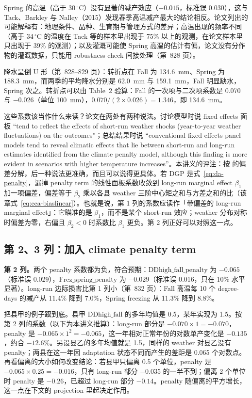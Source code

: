 Spring 的高温（高于 30\,$^\circ$C）没有显著的减产效应（$-0.015$，标准误 0.030），这与 Tack、Barkley 与 Nalley（2015）发现春季高温减产最大的结论相反。论文列出的可能解释有：地理条件、品种、生育期与管理方式的差异；高温出现的频率不同（高于 34\,$^\circ$C 的温度在 Tack 等的样本里出现于 75\% 以上的观测，在论文样本里只出现于 39\% 的观测）；以及灌溉可能使 Spring 高温的估计有偏，论文没有分作物的灌溉数据，只能用 robustness check 间接处理（第~828 页）。

降水呈倒 U 形（第~828--829 页）：转折点在 Fall 为 134.6~mm、Spring 为 188.3~mm，而两季的平均降水分别是 62.0~mm 与 159.1~mm，Fall 明显缺水，Spring 次之。转折点可以由 Table~2 验算：Fall 的一次项与二次项系数是 0.070 与 $-0.026$（单位 100~mm），$0.070/(2\times0.026)=1.346$，即 134.6~mm。

这些系数该当作什么来读？论文在两处有两种说法。讨论模型时说 fixed effects 面板 ``tend to reflect the effects of short-run weather shocks (year-to-year weather fluctuations) on the outcomes''\citep[第~823 页]{da2024climate}；总结结果时说 ``conventional fixed effects panel models tend to reveal climatic effects that lie between short-run and long-run estimates identified from the climate penalty model, although this finding is more evident in scenarios with higher temperature increases''\citep[第~818 页]{da2024climate}。本讲义的评注：按  的偏差分解，后一种说法更准确，而且可以说得更具体。若 DGP 是式~\ref{eq:da-penalty}，漏掉 penalty term 的线性面板系数收敛到 long-run marginal effect $\beta_1$ 加一项偏差，偏差等于 $\beta_2$ 乘以各县 weather 三阶中心矩之和与方差之和的比（该章式~\ref{eq:cca-biaslinear}）。也就是说，第 1 列的系数应读作「带偏差的 long-run marginal effect」：它瞄准的是 $\beta_1$，而不是某个 short-run 效应；weather 分布对称时偏差为零，右偏且 $\beta_2<0$ 时系数比 $\beta_1$ 更负。第 2 列正好可以对照这一点。

\subsection{第 2、3 列：加入 climate penalty term}

\textbf{第 2 列。}两个 penalty 系数都为负，符合预期：$\mathrm{DDhigh\_fall\_penalty}$ 为 $-0.065$（标准误 0.029），$\mathrm{Frez\_spring\_penalty}$ 为 $-0.029$（标准误 0.016，只在 10\% 水平显著）。long-run 边际损害比第 1 列小（第~832 页）：Fall 高温每 10 个 degree-days 的减产从 11.4\% 降到 7.0\%，Spring freezing 从 11.3\% 降到 8.8\%。

把县甲的例子跟到底。县甲 $\mathrm{DDhigh\_fall}$ 的多年均值是 0.5，某年实现为 1.5。按第 2 列的系数（以下为本讲义推算）：long-run 部分是 $-0.070\times1=-0.070$，penalty 是 $-0.065\times1^2=-0.065$，这一年相对正常年份的对数单产变化是 $-0.135$，约合 $-12.6\%$。另设县乙的多年均值就是 1.5，同样的 weather 对县乙没有 penalty；两县在这一年因 adaptation 状态不同而产生的差距是 0.065 个对数点。再看偏离的大小如何改变结论：若县甲只偏离 0.5 个单位，penalty 是 $-0.065\times0.25=-0.016$，只有 long-run 部分 $-0.035$ 的一半不到；偏离 2 个单位时 penalty 是 $-0.26$，已超过 long-run 部分 $-0.14$。penalty 随偏离的平方增长，这一点在下文的 projection 里起决定作用。

